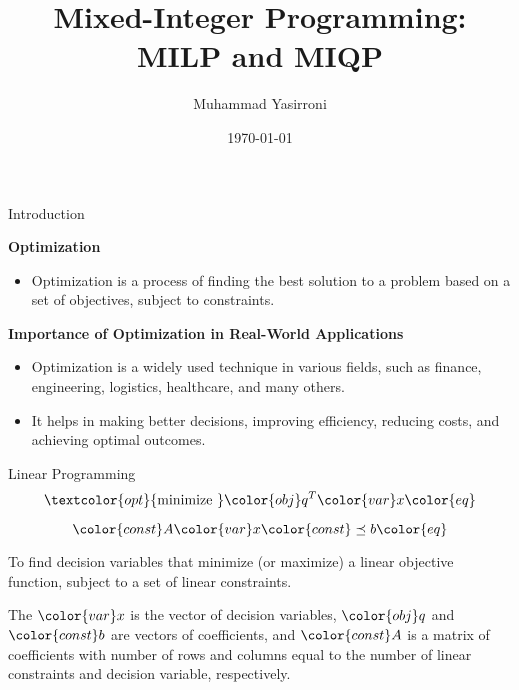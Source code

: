 \documentclass{beamer}
\title{Mixed-Integer Programming: MILP and MIQP}
\author{Muhammad Yasirroni}
\institute{Universitas Gadjah Mada}
\date{\today}
\begin{document}
\frame{\titlepage}

\begin{frame}{Introduction}

    \textbf{Optimization}

    \begin{itemize}
        \item Optimization is a process of finding the best solution to a problem based on a set of objectives, subject to constraints.
    \end{itemize}

    \textbf{Importance of Optimization in Real-World Applications}

    \begin{itemize}
        \item Optimization is a widely used technique in various fields, such as finance, engineering, logistics, healthcare, and many others.
        \item It helps in making better decisions, improving efficiency, reducing costs, and achieving optimal outcomes.
    \end{itemize}

\end{frame}

\begin{frame}{Linear Programming}
    \begin{equation}
        \textcolor{opt}{\text{minimize~}}
        \color{obj} q^T
        \color{var} x
        \color{eq}
    \end{equation}

    \begin{equation}
        \color{const} A
        \color{var} x
        \color{const} \preceq b
        \color{eq}
    \end{equation}

    To find \textcolor{var}{decision variables} that \textcolor{opt}{minimize} (or \textcolor{opt}{maximize}) a \textcolor{obj}{linear objective function}, subject to a set of \textcolor{const}{linear constraints}.

    The $\color{var} x$ is the vector of decision variables, $\color{obj} q$ and $\color{const} b$ are vectors of coefficients, and $\color{const} A$ is a matrix of coefficients with number of rows and columns equal to the number of \textcolor{const}{linear constraints} and \textcolor{var}{decision variable}, respectively.

\end{frame}
\end{document}

